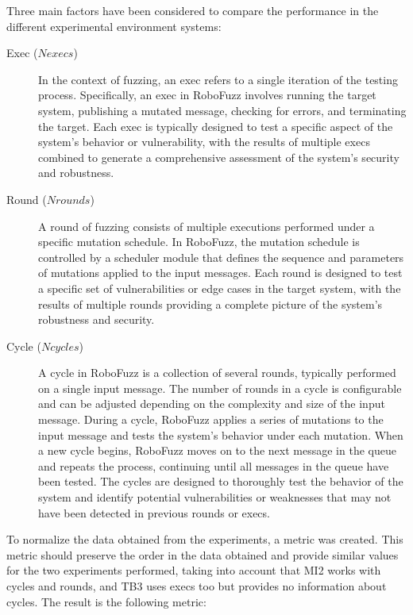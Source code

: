 \documentclass{svproc}
\begin{document}
Three main factors have been considered to compare the performance in the different experimental environment systems: 
\begin{description}

 \item [Exec ($Nexecs$)] In the context of fuzzing, an exec refers to a single iteration of the testing process. Specifically, an exec in RoboFuzz involves running the target system, publishing a mutated message, checking for errors, and terminating the target. Each exec is typically designed to test a specific aspect of the system's behavior or vulnerability, with the results of multiple execs combined to generate a comprehensive assessment of the system's security and robustness.

\item [Round ($Nrounds$)] A round of fuzzing consists of multiple executions performed under a specific mutation schedule. In RoboFuzz, the mutation schedule is controlled by a scheduler module that defines the sequence and parameters of mutations applied to the input messages. Each round is designed to test a specific set of vulnerabilities or edge cases in the target system, with the results of multiple rounds providing a complete picture of the system's robustness and security.

\item [Cycle ($Ncycles$)] A cycle in RoboFuzz is a collection of several rounds, typically performed on a single input message. The number of rounds in a cycle is configurable and can be adjusted depending on the complexity and size of the input message. During a cycle, RoboFuzz applies a series of mutations to the input message and tests the system's behavior under each mutation. When a new cycle begins, RoboFuzz moves on to the next message in the queue and repeats the process, continuing until all messages in the queue have been tested. The cycles are designed to thoroughly test the behavior of the system and identify potential vulnerabilities or weaknesses that may not have been detected in previous rounds or execs.

\end{description}

To normalize the data obtained from the experiments, a metric was created. This metric should preserve the order in the data obtained and provide similar values for the two experiments performed, taking into account that MI2 works with cycles and rounds, and TB3 uses execs too but provides no information about cycles. The result is the following metric: 
\end{document}
